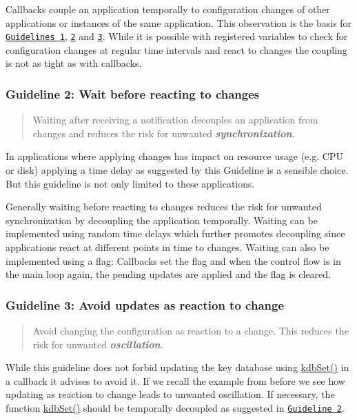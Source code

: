 Callbacks couple an application temporally to configuration changes of other applications or instances of the same application. This observation is the basis for \href{#guideline-1-avoid-callbacks}{\tt Guidelines 1}, \href{#guideline-2-wait-before-reacting-to-changes}{\tt 2} and \href{#guideline-3-avoid-updates-as-reaction-to-change}{\tt 3}. While it is possible with registered variables to check for configuration changes at regular time intervals and react to changes the coupling is not as tight as with callbacks.

\subsubsection*{Guideline 2\+: Wait before reacting to changes}

\begin{quote}
Waiting after receiving a notification decouples an application from changes and reduces the risk for unwanted {\itshape {\bfseries synchronization}}. \end{quote}


In applications where applying changes has impact on resource usage (e.\+g. C\+PU or disk) applying a time delay as suggested by this Guideline is a sensible choice. But this guideline is not only limited to these applications.

Generally waiting before reacting to changes reduces the risk for unwanted synchronization by decoupling the application temporally. Waiting can be implemented using random time delays which further promotes decoupling since applications react at different points in time to changes. Waiting can also be implemented using a flag\+: Callbacks set the flag and when the control flow is in the main loop again, the pending updates are applied and the flag is cleared.

\subsubsection*{Guideline 3\+: Avoid updates as reaction to change}

\begin{quote}
Avoid changing the configuration as reaction to a change. This reduces the risk for unwanted {\itshape {\bfseries oscillation}}. \end{quote}


While this guideline does not forbid updating the key database using {\ttfamily \hyperlink{group__kdb_ga11436b058408f83d303ca5e996832bcf}{kdb\+Set()}} in a callback it advises to avoid it. If we recall the example from before we see how updating as reaction to change leads to unwanted oscillation. If necessary, the function {\ttfamily \hyperlink{group__kdb_ga11436b058408f83d303ca5e996832bcf}{kdb\+Set()}} should be temporally decoupled as suggested in \href{#guideline-2-wait-before-reacting-to-changes}{\tt Guideline 2}.

